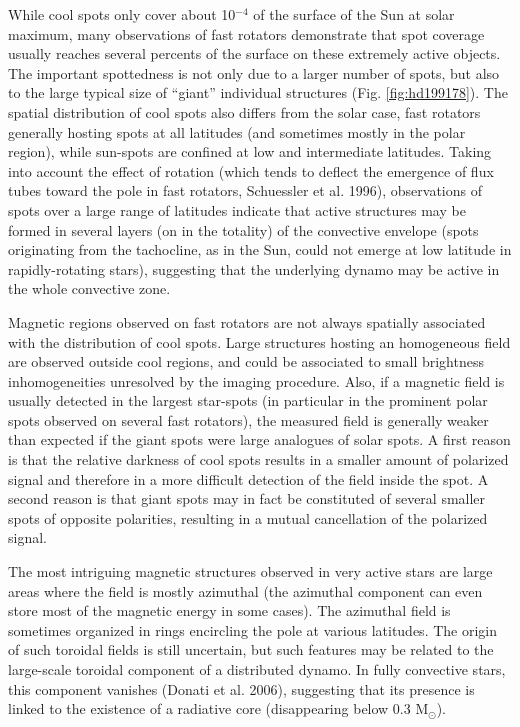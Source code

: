 \documentclass[11pt,twoside]{article}
\begin{document}
While cool spots only cover about 10$^{-4}$ of the surface of the Sun at solar maximum, many observations of fast rotators demonstrate that spot coverage usually reaches several percents of the surface on these extremely active objects. The important spottedness is not only due to a larger number of spots, but also to the large typical size of ``giant'' individual structures (Fig. \ref{fig:hd199178}). The spatial distribution of cool spots also differs from the solar case, fast rotators generally hosting spots at all latitudes (and sometimes mostly in the polar region), while sun-spots are confined at low and intermediate latitudes. Taking into account the effect of rotation (which tends to deflect the emergence of flux tubes toward the pole in fast rotators, Schuessler et al. 1996), observations of spots over a large range of latitudes indicate that active structures may be formed in several layers (on in the totality) of the convective envelope (spots originating from the tachocline, as in the Sun, could not emerge at low latitude in rapidly-rotating stars), suggesting that the underlying dynamo may be active in the whole convective zone.

Magnetic regions observed on fast rotators are not always spatially associated with the distribution of cool spots. Large structures hosting an homogeneous field are observed outside cool regions, and could be associated to small brightness inhomogeneities unresolved by the imaging procedure. Also, if a magnetic field is usually detected in the largest star-spots (in particular in the prominent polar spots observed on several fast rotators), the measured field is generally weaker than expected if the giant spots were large analogues of solar spots. A first reason is that the relative darkness of cool spots results in a smaller amount of polarized signal and therefore in a more difficult detection of the field inside the spot. A second reason is that giant spots may in fact be constituted of several smaller spots of opposite polarities, resulting in a mutual cancellation of the polarized signal. 

The most intriguing magnetic structures observed in very active stars are large areas where the field is mostly azimuthal (the azimuthal component can even store most of the magnetic energy in some cases). The azimuthal field is sometimes organized in rings encircling the pole at various latitudes. The origin of such toroidal fields is still uncertain, but such features may be related to the large-scale toroidal component of a distributed dynamo. In fully convective stars, this component vanishes (Donati et al. 2006), suggesting that its presence is linked to the existence of a radiative core (disappearing below 0.3 M$_\odot$).
\end{document}
